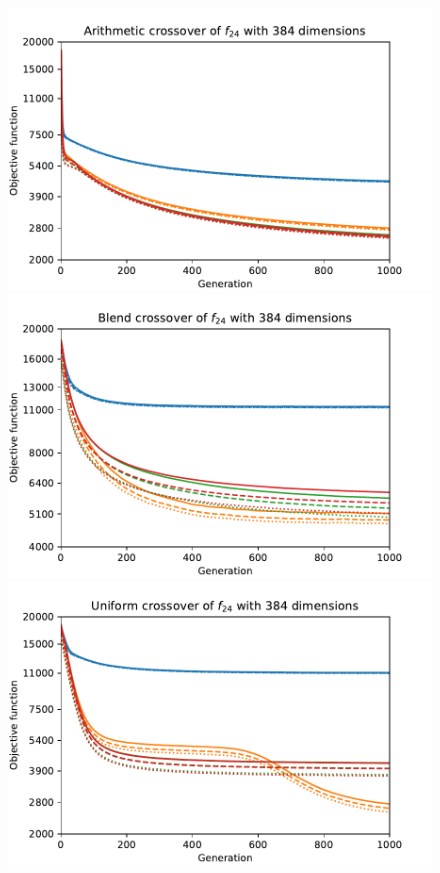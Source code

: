 \begin{figure}[ht!]
        \begin{minipage}[t]{0.32\textwidth}
        \centering
        \includegraphics[width=\textwidth]{img/runs/fitness_es_crossover_f24_dim384_Arithmetic.pdf}
    \end{minipage}
    \hfill
    \begin{minipage}[t]{0.32\textwidth}
        \centering
        \includegraphics[width=\textwidth]{img/runs/fitness_es_crossover_f24_dim384_Blend.pdf}
    \end{minipage}
    \hfill
    \begin{minipage}[t]{0.32\textwidth}
        \centering
        \includegraphics[width=\textwidth]{img/runs/fitness_es_crossover_f24_dim384_Uniform.pdf}

\end{minipage}
\end{figure}
